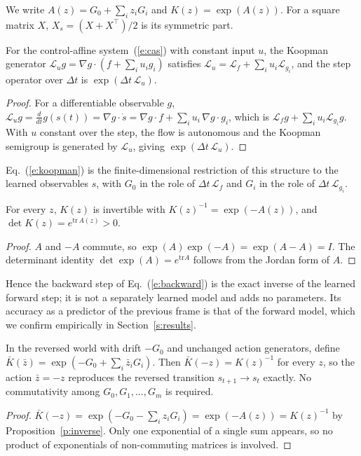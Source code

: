 \documentclass{jcse}
\newcommand{\zb}{\bar{z}}
\begin{document}
We write $A(z)=G_0+\sum_iz_iG_i$ and $K(z)=\exp(A(z))$.
For a square matrix $X$, $X_s=(X+X^\top)/2$ is its symmetric part.

\begin{proposition}
\label{p:affine}
For the control-affine system~(\ref{e:cas}) with constant input $u$, the Koopman generator $\mathcal{L}_u g=\nabla g\cdot(f+\sum_iu_ig_i)$ satisfies $\mathcal{L}_u=\mathcal{L}_f+\sum_iu_i\mathcal{L}_{g_i}$, and the step operator over $\Delta t$ is $\exp(\Delta t\,\mathcal{L}_u)$.
\end{proposition}
\begin{proof}
For a differentiable observable $g$, $\mathcal{L}_ug=\frac{d}{dt}g(s(t))=\nabla g\cdot\dot s=\nabla g\cdot f+\sum_iu_i\,\nabla g\cdot g_i$, which is $\mathcal{L}_fg+\sum_iu_i\mathcal{L}_{g_i}g$.
With $u$ constant over the step, the flow is autonomous and the Koopman semigroup is generated by $\mathcal{L}_u$, giving $\exp(\Delta t\,\mathcal{L}_u)$.
\end{proof}
Eq.~(\ref{e:koopman}) is the finite-dimensional restriction of this structure to the learned observables $s$, with $G_0$ in the role of $\Delta t\,\mathcal{L}_f$ and $G_i$ in the role of $\Delta t\,\mathcal{L}_{g_i}$.

\begin{proposition}
\label{p:inverse}
For every $z$, $K(z)$ is invertible with $K(z)^{-1}=\exp(-A(z))$, and $\det K(z)=e^{\mathrm{tr}\,A(z)}>0$.
\end{proposition}
\begin{proof}
$A$ and $-A$ commute, so $\exp(A)\exp(-A)=\exp(A-A)=I$.
The determinant identity $\det\exp(A)=e^{\mathrm{tr}A}$ follows from the Jordan form of $A$.
\end{proof}
Hence the backward step of Eq.~(\ref{e:backward}) is the exact inverse of the learned forward step; it is not a separately learned model and adds no parameters.
Its accuracy as a predictor of the previous frame is that of the forward model, which we confirm empirically in Section~\ref{s:results}.

\begin{proposition}
\label{p:trev}
In the reversed world with drift $-G_0$ and unchanged action generators, define $\bar K(\zb)=\exp(-G_0+\sum_i\zb_iG_i)$.
Then $\bar K(-z)=K(z)^{-1}$ for every $z$, so the action $\zb=-z$ reproduces the reversed transition $s_{t+1}\to s_t$ exactly.
No commutativity among $G_0,G_1,\dots,G_m$ is required.
\end{proposition}
\begin{proof}
$\bar K(-z)=\exp(-G_0-\sum_iz_iG_i)=\exp(-A(z))=K(z)^{-1}$ by Proposition~\ref{p:inverse}.
Only one exponential of a single sum appears, so no product of exponentials of non-commuting matrices is involved.
\end{proof}
\end{document}
